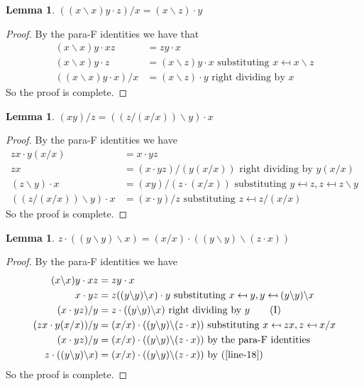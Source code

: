 \documentclass[12pt]{report}
\theoremstyle{definition}
\newtheorem{lem}[thm]{Lemma}
\newcommand{\ldv}{\backslash}       %
\newcommand{\rdv}{/}                %
\begin{document}
\begin{lem}\label{lem-21}
  $((x\ldv x)y \cdot z)\rdv x = (x\ldv z)\cdot y$
\end{lem}

\begin{proof}
  By the para-F identities we have that
  \begin{align*}
    (x\ldv x)y\cdot xz &= zy\cdot x\\
    (x\ldv x)y\cdot z &= (x\ldv z)y\cdot x\text{ substituting $x\mapsfrom x\ldv z$}\\
    ((x\ldv x)y\cdot x)\rdv x &= (x\ldv z)\cdot y\text{ right dividing by $x$}
  \end{align*}
  So the proof is complete.
\end{proof}

\begin{lem}\label{lem-22}
  $(xy)\rdv z = ((z\rdv (x\rdv x))\ldv y)\cdot x$
\end{lem}

\begin{proof}
  By the para-F identities we have
  \begin{align*}
    zx \cdot y(x\rdv x) &= x\cdot yz\\
    zx &= (x\cdot yz)\rdv(y(x\rdv x))\text{ right dividing by $y(x\rdv x)$}\\
    (z\ldv y)\cdot x &= (xy)\rdv (z\cdot (x\rdv x))\text{ substituting $y\mapsfrom z, z\mapsfrom z\ldv y$}\\
    ((z\rdv (x\rdv x))\ldv y)\cdot x &= (x\cdot y)\rdv z\text{ substituting $z\mapsfrom z\rdv (x\rdv x)$}
  \end{align*}
  So the proof is complete.
\end{proof}

\begin{lem}\label{lem-25}
  $z\cdot ((y\ldv y)\ldv x) = (x\rdv x)\cdot ((y\ldv y)\ldv (z\cdot x))$
\end{lem}

\begin{proof}
  By the para-F identities we have
  \begin{align*}
    (x\ldv x)y\cdot xz &= zy\cdot x\\
    x\cdot yz &= z ((y\ldv y)\ldv x)\cdot y\text{ substituting $x\mapsfrom y, y\mapsfrom (y\ldv y)\ldv x$}\\
    (x\cdot yz)\rdv y &= z\cdot ((y\ldv y)\ldv x)\text{ right dividing by $y$} \label{line-18}\tag{I}\\
    (zx\cdot y(x\rdv x))\rdv y &= (x\rdv x)\cdot ((y\ldv y)\ldv(z\cdot x))\text{ substituting $x\mapsfrom zx, z\mapsfrom x\rdv x$}\\
    (x\cdot yz)\rdv y &= (x\rdv x)\cdot ((y\ldv y)\ldv(z\cdot x))\text{ by the para-F identities}\\
    z\cdot ((y\ldv y)\ldv x) &= (x\rdv x)\cdot ((y\ldv y)\ldv(z\cdot x))\text{ by (\ref{line-18})}
  \end{align*}
  So the proof is complete.
\end{proof}
\end{document}
